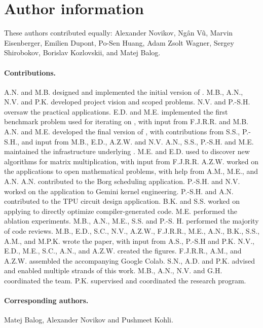 \section*{Author information}
\label{sec:authors}

These authors contributed equally: Alexander Novikov, Ngân Vũ, Marvin Eisenberger, Emilien Dupont, Po-Sen Huang, Adam Zsolt Wagner, Sergey Shirobokov, Borislav Kozlovskii, and Matej Balog.

\paragraph{Contributions.}
A.N. and M.B. designed and implemented the initial version of \method.
\;
M.B., A.N., N.V. and P.K. developed project vision and scoped problems.
\;
N.V. and P.-S.H. oversaw the practical applications.
\;
E.D. and M.E. implemented the first benchmark problem used for iterating on \method, with input from F.J.R.R. and M.B.
\;
A.N. and M.E. developed the final version of \method, with contributions from S.S., P.-S.H., and input from M.B., E.D., A.Z.W. and N.V.
\;
A.N., S.S., P.-S.H. and M.E. maintained the infrastructure underlying \method.
\;
M.E. and E.D. used \method to discover new algorithms for matrix multiplication, with input from F.J.R.R.
\;
A.Z.W. worked on the applications to open mathematical problems, with help from A.M., M.E., and A.N.
\;
A.N. contributed to the Borg scheduling application.
\;
P.-S.H. and N.V. worked on the application to Gemini kernel engineering.
\;
P.-S.H. and A.N. contributed to the TPU circuit design application.
\;
B.K. and S.S. worked on applying \method to directly optimize compiler-generated code.
\;
M.E. performed the ablation experiments.
\;
M.B., A.N., M.E., S.S. and P.-S. H. performed the majority of code reviews.
\;
M.B., E.D., S.C., N.V., A.Z.W., F.J.R.R., M.E., A.N., B.K., S.S., A.M., and M.P.K. wrote the paper, with input from A.S.,  P.-S.H and P.K.
\;
N.V., E.D., M.E., S.C., A.N., and A.Z.W. created the figures.
\;
F.J.R.R., A.M., and A.Z.W. assembled the accompanying Google Colab.
\;
S.N., A.D. and P.K. advised and enabled multiple strands of this work.
\;
M.B., A.N., N.V. and G.H. coordinated the team. 
\;
P.K. supervised and coordinated the research program. 

\paragraph{Corresponding authors.}
Matej Balog, Alexander Novikov and Pushmeet Kohli.